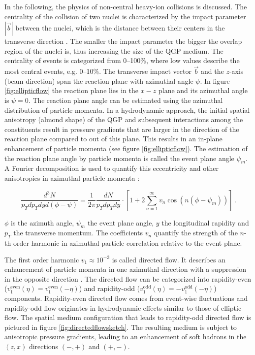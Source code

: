 \documentclass[
  a4paper,
  12pt,
  oneside,
  parskip=half,
  listof=totoc,
  bibliography=totoc,
  DIV=12,
  numbers=noenddot,
  BA.tex
  ]{subfiles}
\begin{document}
In the following, the physics of non-central heavy-ion collisions is discussed. The centrality of the collision of two nuclei is characterized by the impact parameter $|\vec{b}|$ between the nuclei, which is the distance between their centers in the transverse direction \cite{collaboration_centrality_2021}. The smaller the impact parameter the bigger the overlap region of the nuclei is, thus increasing the size of the QGP medium. The centrality of events is categorized from 0--100\%, where low values describe the most central events, e.g. 0--10\%. The transverse impact vector $\vec{b}$ and the $z$-axis (beam direction) span the reaction plane with azimuthal angle $\psi$. In figure \ref{fig:ellipticflow} the reaction plane lies in the $x-z$ plane and its azimuthal angle is $\psi = 0$. The reaction plane angle can be estimated using the azimuthal distribution of particle momenta. In a hydrodynamic approach, the initial spatial anisotropy (almond shape) of the QGP and subsequent interactions among the constituents result in pressure gradients that are larger in the direction of the reaction plane compared to out of this plane. This results in an in-plane enhancement of particle momenta \cite{snellings_elliptic_2011} (see figure \ref{fig:ellipticflow}). The estimation of the reaction plane angle by particle momenta is called the event plane angle $\psi_m$. A Fourier decomposition is used to quantify this eccentricity and other anisotropies in azimuthal particle momenta  \cite{voloshin_flow_1996}:

\begin{equation}
	\frac{d^3 N}{p_T d p_T dy d(\phi - \psi)} = \frac{1}{2 \pi} \frac{d N}{p_T d p_T dy} \cdot \left[1 + 2 \sum_{n=1}^{\infty} v_n \cos(n(\phi - \psi_m)) \right] \, .
	\label{eq:FourierExpansion}
\end{equation}

$\phi$ is the azimuth angle, $\psi_m$ the event plane angle, $y$ the longitudinal rapidity and $p_T$ the transverse momentum. The coefficients $v_n$ quantify the strength of the $n$-th order harmonic in azimuthal particle correlation relative to the event plane.

The first order harmonic $v_1 \approx 10^{-3}$ \cite{selyuzhenkov_charged_2011} is called directed flow. It describes an enhancement of particle momenta in one azimuthal direction with a suppression in the opposite direction \cite{voloshin_flow_1996}. The directed flow can be categorized into rapidity-even ($v_1^\text{even}(\eta) = v_1^\text{even}(- \eta)$) and rapidity-odd ($v_1^\text{odd}(\eta) = - v_1^\text{odd}(- \eta)$) components. Rapidity-even directed flow comes from event-wise fluctuations \cite{luzum_directed_2011} and rapidity-odd flow originates in hydrodynamic effects similar to those of elliptic flow. The spatial medium configuration that leads to rapidity-odd directed flow is pictured in figure \ref{fig:directedflowsketch}. The resulting medium is subject to anisotropic pressure gradients, leading to an enhancement of soft hadrons in the $(z, x)$ directions $(-,+)$ and $(+,-)$.
\end{document}
